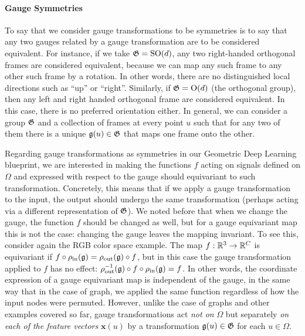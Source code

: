 
\paragraph{Gauge Symmetries}
To say that we consider gauge transformations to be symmetries is to say that any two gauges related by a gauge transformation are to be considered equivalent. %
For instance, if we take ${\mathfrak{G}} = \operatorname{SO}(d)$, any two right-handed orthogonal frames are considered equivalent, because we can map any such frame to any other such frame by a rotation.
In other words, there are no distinguished local directions such as ``up'' or ``right''.
Similarly, if ${\mathfrak{G}} = \operatorname{O}(d)$ (the orthogonal group), then any left and right handed orthogonal frame are considered equivalent.
In this case, there is no preferred orientation either.
%
%
%
In general, we can consider a group ${\mathfrak{G}}$ %
and a collection of frames at every point $u$ such that for any two of them there is a unique ${\mathfrak{g}}(u) \in {\mathfrak{G}}$ that maps one frame onto the other. 
%


Regarding gauge transformations as symmetries in our Geometric Deep Learning blueprint, we are interested in making  
the functions $f$ acting on signals defined on $\Omega$ and expressed with respect to the gauge should equivariant to such transformation. 
%
Concretely, this means that if we apply a gauge transformation to the input, the output should undergo the same transformation (perhaps acting via a different representation of ${\mathfrak{G}}$).
We noted before that when we change the gauge, the function $f$ should be changed as well, but for a gauge equivariant map this is not the case: changing the gauge leaves the mapping invariant.
To see this, consider again the RGB color space example.
The map $f : \mathbb{R}^3 \rightarrow \mathbb{R}^C$ is equivariant if $f \circ \rho_{\textup{in}}({\mathfrak{g}}) = \rho_{\textup{out}}({\mathfrak{g}}) \circ f$, but in this case the gauge transformation applied to $f$ has no effect: $\rho_{\textup{out}}^{-1}({\mathfrak{g}}) \circ f \circ \rho_{\textup{in}}({\mathfrak{g}}) = f$.
In other words, the coordinate expression of a gauge equivariant map is independent of the gauge, in the same way that 
in the case of graph, we applied the same function 
regardless of how the input nodes were permuted. 
However, unlike the case of graphs and other examples covered so far, gauge transformations act {\em not on} $\Omega$ but separately {\em on each of the feature vectors} $\mathbf{x}(u)$ by a transformation ${\mathfrak{g}}(u) \in {\mathfrak{G}}$ for each $u \in \Omega$.

